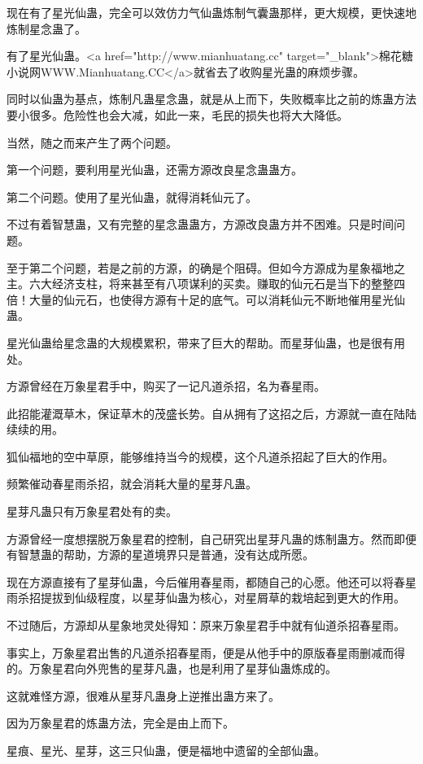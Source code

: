 \begin{this_body}
现在有了星光仙蛊，完全可以效仿力气仙蛊炼制气囊蛊那样，更大规模，更快速地炼制星念蛊了。

有了星光仙蛊。<a href="http://www.mianhuatang.cc" target="\_blank">棉花糖小说网WWW.Mianhuatang.CC</a>就省去了收购星光蛊的麻烦步骤。

同时以仙蛊为基点，炼制凡蛊星念蛊，就是从上而下，失败概率比之前的炼蛊方法要小很多。危险性也会大减，如此一来，毛民的损失也将大大降低。

当然，随之而来产生了两个问题。

第一个问题，要利用星光仙蛊，还需方源改良星念蛊蛊方。

第二个问题。使用了星光仙蛊，就得消耗仙元了。

不过有着智慧蛊，又有完整的星念蛊蛊方，方源改良蛊方并不困难。只是时间问题。

至于第二个问题，若是之前的方源，的确是个阻碍。但如今方源成为星象福地之主。六大经济支柱，将来甚至有八项谋利的买卖。赚取的仙元石是当下的整整四倍！大量的仙元石，也使得方源有十足的底气。可以消耗仙元不断地催用星光仙蛊。

星光仙蛊给星念蛊的大规模累积，带来了巨大的帮助。而星芽仙蛊，也是很有用处。

方源曾经在万象星君手中，购买了一记凡道杀招，名为春星雨。

此招能灌溉草木，保证草木的茂盛长势。自从拥有了这招之后，方源就一直在陆陆续续的用。

狐仙福地的空中草原，能够维持当今的规模，这个凡道杀招起了巨大的作用。

频繁催动春星雨杀招，就会消耗大量的星芽凡蛊。

星芽凡蛊只有万象星君处有的卖。

方源曾经一度想摆脱万象星君的控制，自己研究出星芽凡蛊的炼制蛊方。然而即便有智慧蛊的帮助，方源的星道境界只是普通，没有达成所愿。

现在方源直接有了星芽仙蛊，今后催用春星雨，都随自己的心愿。他还可以将春星雨杀招提拔到仙级程度，以星芽仙蛊为核心，对星屑草的栽培起到更大的作用。

不过随后，方源却从星象地灵处得知：原来万象星君手中就有仙道杀招春星雨。

事实上，万象星君出售的凡道杀招春星雨，便是从他手中的原版春星雨删减而得的。万象星君向外兜售的星芽凡蛊，也是利用了星芽仙蛊炼成的。

这就难怪方源，很难从星芽凡蛊身上逆推出蛊方来了。

因为万象星君的炼蛊方法，完全是由上而下。

星痕、星光、星芽，这三只仙蛊，便是福地中遗留的全部仙蛊。


\end{this_body}
